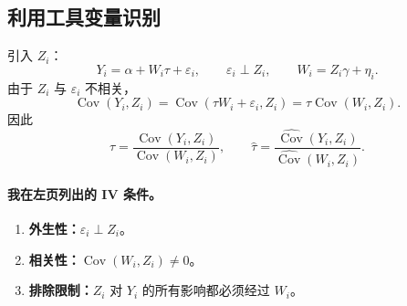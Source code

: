 \documentclass[11pt,a4paper]{article}
\begin{document}
\subsection{利用工具变量识别}
引入 $Z_i$：
\[
 Y_i=\alpha+W_i\tau+\varepsilon_i,\qquad\varepsilon_i\perp Z_i,
 \qquad W_i=Z_i\gamma+\eta_i.\tag{9.4}
\]
由于 $Z_i$ 与 $\varepsilon_i$ 不相关，
\[
 \operatorname{Cov}(Y_i,Z_i)
 =\operatorname{Cov}(\tau W_i+\varepsilon_i,Z_i)
 =\tau\operatorname{Cov}(W_i,Z_i).
\]
因此
\[
 \tau=\frac{\operatorname{Cov}(Y_i,Z_i)}{\operatorname{Cov}(W_i,Z_i)},
 \qquad
 \widehat\tau=\frac{\widehat{\operatorname{Cov}}(Y_i,Z_i)}
 {\widehat{\operatorname{Cov}}(W_i,Z_i)}.
\]

\paragraph{我在左页列出的 IV 条件。}
\begin{enumerate}
 \item \textbf{外生性：}$\varepsilon_i\perp Z_i$。
 \item \textbf{相关性：}$\operatorname{Cov}(W_i,Z_i)\ne0$。
 \item \textbf{排除限制：}$Z_i$ 对 $Y_i$ 的所有影响都必须经过 $W_i$。
\end{enumerate}
\begin{center}\end{center}

\end{document}
